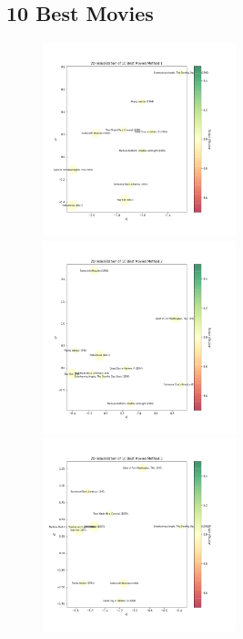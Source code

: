 \documentclass{article}
\begin{document}
\newpage

\subsection{10 Best Movies}

\begin{figure}[H]
\includegraphics[width=0.5\textwidth]{matrixfactorization/2D Visualization of 10 Best Movies Method 1.png}
\includegraphics[width=0.5\textwidth]{matrixfactorization/2D Visualization of 10 Best Movies Method 2.png}
\includegraphics[width=0.5\textwidth]{matrixfactorization/2D Visualization of 10 Best Movies Method 3.png}
\end{figure}
\end{document}
